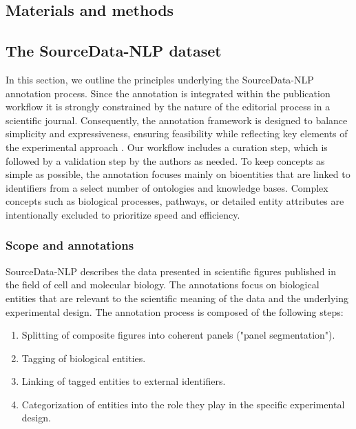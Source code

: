 \documentclass{bioinfo}
\begin{document}
\begin{methods}
\section{Materials and methods}

\subsection{The SourceData-NLP dataset}\label{sec:soda_dataset}

In this section, we outline the principles underlying the SourceData-NLP annotation process. Since the annotation is integrated within the publication workflow it is strongly constrained by the nature of the editorial process in a scientific journal. Consequently, the annotation framework is designed to balance simplicity and expressiveness,  ensuring feasibility while reflecting key elements of the experimental approach \citep{sourcedata}. Our workflow includes a curation step, which is followed by a validation step by the authors as needed. To keep concepts as simple as possible, the annotation focuses mainly on bioentities that are linked to identifiers from a select number of ontologies and knowledge bases. Complex concepts such as biological processes, pathways, or detailed entity attributes are intentionally excluded to prioritize speed and efficiency.

\subsubsection{Scope and annotations}\label{sec:scope}

SourceData-NLP describes the data presented in scientific figures published in the field of cell 
and molecular biology. The annotations focus on biological entities that are relevant to the
scientific meaning of the data and the underlying experimental design.
The annotation process is composed of the following steps:
\begin{enumerate}
    \item Splitting of composite figures into coherent panels ("panel segmentation").
    \item Tagging of biological entities.
    \item Linking of tagged entities to external identifiers.
    \item Categorization of entities into the role they play in the specific experimental design.
\end{enumerate}


\end{methods}
\end{document}
